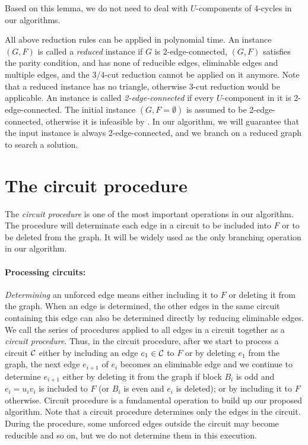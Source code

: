 \documentclass[runningheads]{llncs}
\begin{document}

Based on this lemma, we do not need to deal with $U$-components of 4-cycles in our algorithms.

\bigskip
All above reduction rules can be applied in polynomial time. An instance $(G,F)$ is called a \emph{reduced} instance if
$G$ is 2-edge-connected, $(G,F)$ satisfies the parity condition, and
  has none of reducible edges, eliminable edges and multiple edges, and the 3/4-cut reduction cannot be applied on it anymore.
Note that a reduced instance has no triangle, otherwise 3-cut reduction would be applicable.
An instance is called {\em 2-edge-connected}
if
every $U$-component in it is 2-edge-connected.
The initial instance $(G,F=\emptyset)$ is assumed to be 2-edge-connected, otherwise
it is infeasible by .
In our algorithm, we will guarantee that the input instance is always 2-edge-connected,
and we branch on a reduced graph to search a solution.







\section{The circuit procedure}
The \emph{circuit procedure} is one of the most important operations in our algorithm.
The procedure will determinate each edge in a circuit to be included into $F$ or to be deleted from the graph.
It will be widely used as the only branching operation in our algorithm.

\paragraph{Processing circuits:}
\emph{Determining} an unforced edge means either including it to $F$ or deleting it from the graph.
 When an edge is determined, the other edges in the same circuit containing this edge can also be determined directly by reducing eliminable edges. We call the series of procedures applied to all edges in a circuit together as a \emph{circuit procedure}.
Thus, in the circuit procedure, after we start to process a circuit ${\cal C}$ either by including an edge $e_1\in {\cal C}$ to $F$
 or by deleting $e_1$ from the graph, the next edge $e_{i+1}$ of $e_i$ becomes an eliminable edge and we continue to determine $e_{i+1}$
either by deleting it  from the graph if block $B_i$ is odd and $e_i=u_{i}v_i$
 is included to $F$ (or $B_i$ is even and $e_i$ is deleted);
or  by including it to $F$ otherwise.
Circuit procedure is a fundamental operation
 to build up our proposed algorithm. Note that a circuit procedure determines only the edges in the circuit.
During the procedure, some unforced edges outside the circuit may become reducible  and so on,
 but we do not determine them in this execution.
\end{document}
